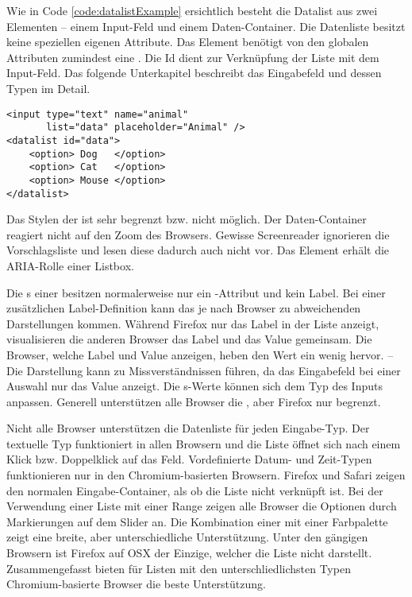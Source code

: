 Wie in Code \ref{code:datalistExample} ersichtlich besteht die Datalist aus zwei Elementen – einem Input-Feld und einem Daten-Container. 
Die Datenliste besitzt keine speziellen eigenen Attribute. 
Das Element benötigt von den globalen Attributen zumindest eine . 
Die Id dient zur Verknüpfung der Liste mit dem Input-Feld. 
Das folgende Unterkapitel \textbf{} beschreibt das Eingabefeld und dessen Typen im Detail. 

\begin{lstlisting}[style = htmlcssjs, caption = Datalist Beispiel, label = code:datalistExample]
<input type="text" name="animal" 
       list="data" placeholder="Animal" />
<datalist id="data">
    <option> Dog   </option>
    <option> Cat   </option>
    <option> Mouse </option>
</datalist>
\end{lstlisting}

Das Stylen der  ist sehr begrenzt bzw. nicht möglich. 
Der Daten-Container reagiert nicht auf den Zoom des Browsers. 
Gewisse Screenreader ignorieren die Vorschlagsliste und lesen diese dadurch auch nicht vor. 
Das Element erhält die ARIA-Rolle einer Listbox. 

Die s einer  besitzen normalerweise nur ein -Attribut und kein Label. 
Bei einer zusätzlichen Label-Definition kann das je nach Browser zu abweichenden Darstellungen kommen. 
Während Firefox nur das Label in der Liste anzeigt, visualisieren die anderen Browser das Label und das Value gemeinsam. 
Die Browser, welche Label und Value anzeigen, heben den Wert ein wenig hervor. 
--
Die Darstellung kann zu Missverständnissen führen, da das Eingabefeld bei einer Auswahl nur das Value anzeigt. 
Die s-Werte können sich dem Typ des Inputs anpassen. 
Generell unterstützen alle Browser die , aber Firefox nur begrenzt. 

Nicht alle Browser unterstützen die Datenliste für jeden Eingabe-Typ. 
Der textuelle Typ funktioniert in allen Browsern und die Liste öffnet sich nach einem Klick bzw. Doppelklick auf das Feld. 
Vordefinierte Datum- und Zeit-Typen funktionieren nur in den Chromium-basierten Browsern. 
Firefox und Safari zeigen den normalen Eingabe-Container, als ob die Liste nicht verknüpft ist. 
Bei der Verwendung einer Liste mit einer Range zeigen alle Browser die Optionen durch Markierungen auf dem Slider an. 
Die Kombination einer  mit einer Farbpalette zeigt eine breite, aber unterschiedliche Unterstützung. 
Unter den gängigen Browsern ist Firefox auf OSX der Einzige, welcher die Liste nicht darstellt. 
Zusammengefasst bieten für Listen mit den unterschliedlichsten Typen Chromium-basierte Browser die beste Unterstützung. 


